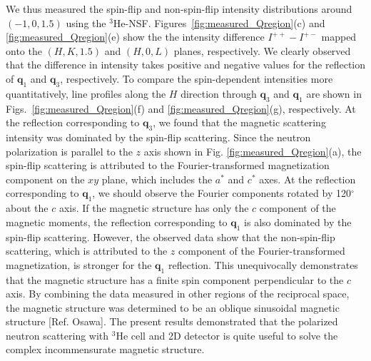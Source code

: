 \documentclass[%
 reprint,
superscriptaddress,
 amsmath,amssymb,
 aps,
floatfix,
]{revtex4-2}
\newcommand{\He}{$^3$He }
\newcommand{\Hensf}{$^3$He-NSF}
\begin{document}
We thus measured the spin-flip and non-spin-flip intensity distributions around $(-1,0,1.5)$ using the \Hensf.  Figures~\ref{fig:measured_Qregion}(c) and \ref{fig:measured_Qregion}(e) show the the intensity difference \(I^{++}-I^{+-}\) mapped onto the $(H,K,1.5)$ and $(H,0,L)$ planes, respectively. 
We clearly observed that the difference in intensity takes positive and negative values for the reflection of $\boldsymbol{q}_1$ and $\boldsymbol{q}_3$, respectively. 
To compare the spin-dependent intensities more quantitatively, line profiles along the \(H\) direction through \(\boldsymbol{q}_3\) and \(\boldsymbol{q}_1\) are shown in Figs.~\ref{fig:measured_Qregion}(f) and \ref{fig:measured_Qregion}(g), respectively.
At the reflection corresponding to $\boldsymbol{q}_3$, we found that the magnetic scattering intensity was dominated by the spin-flip scattering. 
Since the neutron polarization is parallel to the $z$ axis shown in Fig. \ref{fig:measured_Qregion}(a), the spin-flip scattering is attributed to the Fourier-transformed magnetization component on the $xy$ plane, which includes the $a^*$ and $c^*$ axes. %
At the reflection corresponding to $\boldsymbol{q}_1$, we should observe the Fourier components rotated by 120$^{\circ}$ about the $c$ axis. 
If the magnetic structure has only the $c$ component of the magnetic moments, the reflection corresponding to $\boldsymbol{q}_1$ is also dominated by the spin-flip scattering. 
However, the observed data show that the non-spin-flip scattering, which is attributed to the $z$ component of the Fourier-transformed magnetization, is stronger for the $\boldsymbol{q}_1$ reflection. %
This unequivocally demonstrates that the magnetic structure has a finite spin component perpendicular to the $c$ axis. %
By combining the data measured in other regions of the reciprocal space, the magnetic structure was determined to be an oblique sinusoidal magnetic structure [Ref. Osawa]. %
The present results demonstrated that the polarized neutron scattering with \He cell and 2D detector is quite useful to solve the complex incommensurate magnetic structure. 
\end{document}
